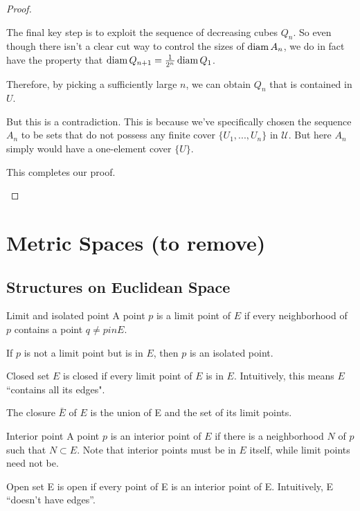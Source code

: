 \begin{proof}
\begin{enumerate}
The final key step is to exploit the sequence of decreasing cubes $Q_n$. So even though there isn't a clear cut way to control the sizes of $\operatorname{diam} A_n$, we do in fact have the property that $\operatorname{diam} Q_{n+1} = \frac{1}{2^n} \operatorname{diam} Q_1$.

Therefore, by picking a sufficiently large $n$, we can obtain $Q_n$ that is contained in $U$.

But this is a contradiction. 
This is because we've specifically chosen the sequence $A_n$ to be sets that do not possess any finite cover $\{U_1,...,U_n\}$ in $\mathscr{U}$. But here $A_n$ simply would have a one-element cover $\{U\}$.

This completes our proof.
\end{enumerate}
\end{proof}

\chapter{Metric Spaces (to remove)}

\section{Structures on Euclidean Space}
\begin{defn}{Limit and isolated point}{}
A point $p$ is a limit point of $E$ if every neighborhood of $p$ contains a point $q \neq p in E$. 

If $p$ is not a limit point but is in $E$, then $p$ is an isolated point.
\end{defn}

\begin{defn}{Closed set}{}
$E$ is closed if every limit point of $E$ is in $E$. Intuitively, this means $E$ ``contains all its edges".

The closure $\bar{E}$ of $E$ is the union of E and the set of its limit points.
\end{defn}

\begin{defn}{Interior point}{}
A point $p$ is an interior point of $E$ if there is a neighborhood $N$ of $p$ such that $N \subset E$. Note that interior points must be in $E$ itself, while limit points need not be.
\end{defn}

\begin{defn}{Open set}{}
E is open if every point of E is an interior point of E. Intuitively, E “doesn’t have edges”.
\end{defn}

